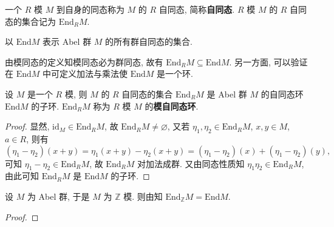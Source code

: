 \documentclass[../../main.tex]{subfiles}%
\begin{document}
\begin{definition}
一个 \( R \) 模 \( M \) 到自身的同态称为 \( M \) 的 \( R \) 自同态, 简称\textbf{自同态}. \( R \) 模 \( M \) 的 \( R \) 自同态的集合记为 \( \text{End}_R M \). 

以 \( \text{End}M \) 表示 Abel 群 \( M \) 的所有群自同态的集合.
\end{definition}
\begin{remark}
由模同态的定义知模同态必为群同态, 故有 \( \text{End}_R M \subseteq \text{End}M \). 另一方面, 可以验证在 \( \text{End}M \) 中可定义加法与乘法使 \( \text{End}M \) 是一个环. 
\end{remark}

\begin{theorem}\label{theorem:抽象代数-定理 1.6.2}
设 \( M \) 是一个 \( R \) 模, 则 \( M \) 的 \( R \) 自同态的集合 \( \text{End}_R M \) 是 Abel 群 \( M \) 的自同态环 \( \text{End}M \) 的子环. \( \text{End}_R M \) 称为 \( R \) 模 \( M \) 的\textbf{模自同态环}.
\end{theorem}
\begin{proof}

显然, \( \text{id}_M \in \text{End}_R M \), 故 \( \text{End}_R M \neq \varnothing \), 又若 \( \eta_1, \eta_2 \in \text{End}_R M \), \( x, y \in M \), \( a \in R \), 则有
\[
(\eta_1 - \eta_2)(x + y) = \eta_1(x + y) - \eta_2(x + y) = (\eta_1 - \eta_2)(x) + (\eta_1 - \eta_2)(y),
\]
可知 \( \eta_1 - \eta_2 \in \text{End}_R M \), 故 \( \text{End}_R M \) 对加法成群. 又由同态性质知 \( \eta_1\eta_2 \in \text{End}_R M \), 由此可知 \( \text{End}_R M \) 是 \( \text{End}M \) 的子环.

\end{proof}

\begin{example}
设 \( M \) 为 Abel 群, 于是 \( M \) 为 \( \mathbb{Z} \) 模. 则由知 \( \text{End}_\mathbb{Z} M = \text{End}M \).
\end{example}
\begin{proof}



\end{proof}
\end{document}
